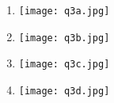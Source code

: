 \begin{question}

    \begin{enumerate}[label=\textbf{\alph*})]
        \item 
        \begin{minipage}{\textwidth}
            \centering 
            \texttt{[image: q3a.jpg]}
        \end{minipage}
        \item 
        \begin{minipage}{\textwidth}
            \centering 
            \texttt{[image: q3b.jpg]}
        \end{minipage}
        \item 
        \begin{minipage}{\textwidth}
            \centering 
            \texttt{[image: q3c.jpg]}
        \end{minipage}
        \item 
        \begin{minipage}{\textwidth}
            \centering 
            \texttt{[image: q3d.jpg]}
        \end{minipage}

    \end{enumerate}	

\end{question}